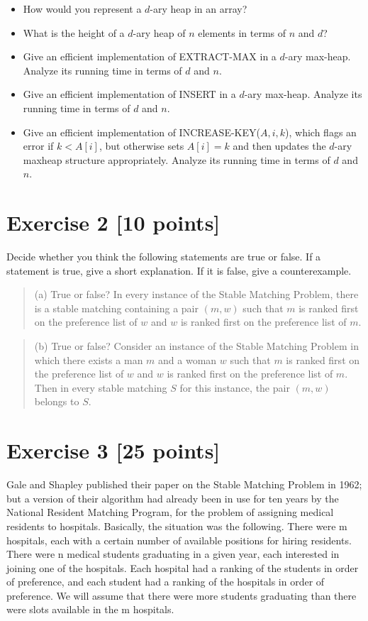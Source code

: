 \documentclass[11pt]{article}
\theoremstyle{theorem}
\theoremstyle{lemma}
\theoremstyle{corollary}
\theoremstyle{definition}
\begin{document}
\begin{itemize}
    \item [a.]  How would you represent a $d$-ary  heap in an array? 
    \item [b.] What is the height of a $d$-ary heap of $n$ elements in terms of $n$ and $d$?
    \item [c.] Give an efficient implementation of EXTRACT-MAX in a $d$-ary max-heap. Analyze
its running time in terms of $d$ and $n$.
\item [d.] Give an efficient implementation of INSERT in a $d$-ary max-heap. Analyze its
running time in terms of $d$ and $n$. 
\item [e.] Give an efficient implementation of INCREASE-KEY($A,i,k$), which flags an
error if $k<A[i]$, but otherwise sets $A[i]=k$  and then updates the $d$-ary maxheap
structure appropriately. Analyze its running time in terms of $d$ and $n$.
\end{itemize}

\section*{Exercise 2 [10 points]}

Decide whether you think the following statements are true or false. If a statement is
true, give a short explanation. If it is false, give a counterexample. 

\begin{quote}
(a) True or false? In every instance of the Stable Matching Problem, there is a
stable matching containing a pair $(m, w)$ such that $m$ is ranked first on the
preference list of $w$ and $w$ is ranked first on the preference list of $m$.
\end{quote}

\begin{quote}
(b) True or false? Consider an instance of the Stable Matching Problem in which
there exists a man $m$ and a woman  $w$ such that $m$ is ranked first on the
preference list of  $w$ and $w$ is ranked first on the preference list of $m$. Then in
every stable matching $S$ for this instance, the pair $(m, w)$ belongs to $S$.
\end{quote}


 
\section*{Exercise 3 [25 points]}
Gale and Shapley published their paper on the Stable Matching Problem
in 1962; but a version of their algorithm had already been in use for
ten years by the National Resident Matching Program, for the problem of
assigning medical residents to hospitals.
Basically, the situation was the following. There were m hospitals,
each with a certain number of available positions for hiring residents.
There were n medical students graduating in a given year, each interested
in joining one of the hospitals. Each hospital had a ranking of the students
in order of preference, and each student had a ranking of the hospitals
in order of preference. We will assume that there were more students
graduating than there were slots available in the m hospitals.
\end{document}
